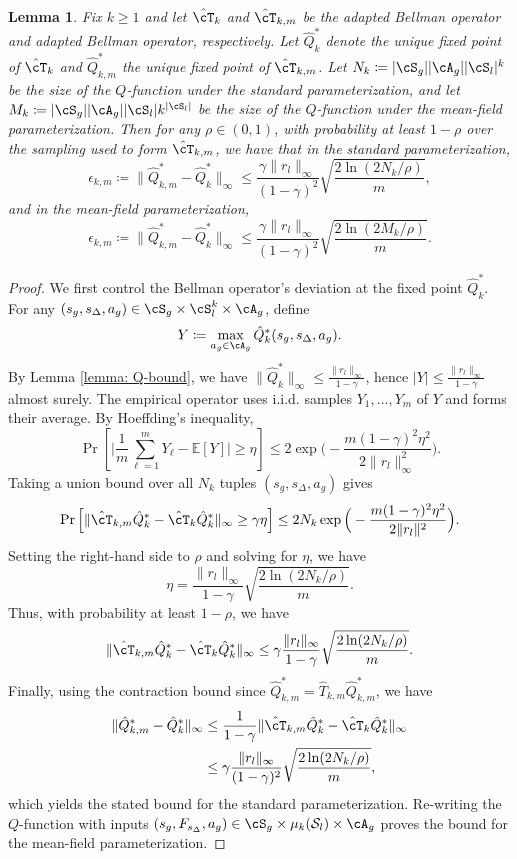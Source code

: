 \documentclass{article}
\theoremstyle{plain}
\newtheorem{lemma}[theorem]{Lemma}
\theoremstyle{definition}
\begin{document}
 \begin{lemma}\label{lemma: yuejie bound}
    Fix $k\ge 1$ and let $\hat{\cT}_k$ and $\hat{\cT}_{k,m}$ be the adapted Bellman operator and adapted Bellman operator, respectively.
Let $\hat Q_k^*$ denote the unique fixed point of $\hat {\cT}_k$ and $\hat Q_{k,m}^*$
the unique fixed point of $\hat{\cT}_{k,m}$.
Let $N_k  \coloneqq  |\cS_g| |\cA_g| |\cS_l|^k$ be the size of the $Q$-function under the standard parameterization, and let $M_k \coloneqq |\cS_g| |\cA_g| |\cS_l| k^{|\cS_l|}$ be the size of the $Q$-function under the mean-field parameterization. Then for any $\rho\in(0,1)$, with probability at least $1-\rho$ over the sampling used to form $\hat{\cT}_{k,m}$, we have that in the standard parameterization,
\[\epsilon_{k,m}  \coloneqq  \|\hat Q_{k,m}^*-\hat Q_k^*\|_\infty
\leq \frac{\gamma\|r_l\|_\infty}{(1-\gamma)^2}\sqrt{\frac{2\ln(2N_k/\rho)}{m}},\]
and in the mean-field parameterization,
\[\epsilon_{k,m}  \coloneqq  \|\hat Q_{k,m}^*-\hat Q_k^*\|_\infty
\leq \frac{\gamma\|r_l\|_\infty}{(1-\gamma)^2}\sqrt{\frac{2\ln(2M_k/\rho)}{m}}.\]
\end{lemma}


\begin{proof}
    We first control the Bellman operator's deviation at the fixed point $\hat Q_k^*$.
For any $(s_g, s_\Delta, a_g)\in \cS_g\times \cS_l^k \times \cA_g$, define
\[Y \coloneqq  \max_{a_g\in\cA_g} \hat Q_k^*(s_g,s_\Delta,a_g).\] By Lemma \ref{lemma: Q-bound}, we have $\|\hat Q_k^*\|_\infty \leq \frac{\|r_l\|_\infty}{1-\gamma}$, hence $|Y|\le \frac{\|r_l\|_\infty}{1-\gamma}$ almost surely. The empirical operator uses i.i.d. samples $Y_1,\dots,Y_m$ of $Y$ and forms their average.
By Hoeffding's inequality,
\[\Pr\left[\Big|\frac{1}{m}\sum_{\ell=1}^m Y_\ell - \mathbb{E}[Y]\Big|\ge \eta\right]
\le 2\exp\Big(-\frac{m(1-\gamma)^2\eta^2}{2\|r_l\|_\infty^2}\Big).
\]
Taking a union bound over all $N_k$ tuples $(s_g, s_\Delta, a_g)$ gives
\[\Pr\left[\|\hat \cT_{k,m}\hat Q_k^*-\hat {\cT}_k \hat Q_k^*\|_\infty\ge \gamma\eta\right] \leq 2N_k \exp\Big(-\frac{m(1-\gamma)^2\eta^2}{2\|r_l\|^2}\Big).
\]
Setting the right-hand side to $\rho$ and solving for $\eta$, we have
\[\eta = \frac{\|r_l\|_\infty}{1-\gamma}\sqrt{\frac{2\ln(2N_k/\rho)}{m}}.\]
Thus, with probability at least $1-\rho$, we have
\[\|\hat {\cT}_{k,m}\hat Q_k^*-\hat {\cT}_k\hat Q_k^*\|_\infty
\le \gamma \frac{\|r_l\|_\infty}{1-\gamma}\sqrt{\frac{2\ln(2N_k/\rho)}{m}}. \]
Finally, using the contraction bound since $\hat Q_{k,m}^*=\hat T_{k,m}\hat Q_{k,m}^*$, we have
\begin{align*}\|\hat Q_{k,m}^*-\hat Q_k^*\|_\infty
&\leq \frac{1}{1-\gamma}\|\hat {\cT}_{k,m}\hat Q_k^*-\hat {\cT}_k\hat Q_k^*\|_\infty \\
&\leq \gamma \frac{\|r_l\|_\infty}{(1-\gamma)^2}\sqrt{\frac{2\ln(2N_k/\rho)}{m}},
\end{align*}
which yields the stated bound for the standard parameterization. Re-writing the $Q$-function with inputs $(s_g, F_{s_\Delta}, a_g)\in \cS_g\times \mu_k(\mathcal S_l)\times\cA_g$ proves the bound for the mean-field parameterization.
\end{proof}
\end{document}
